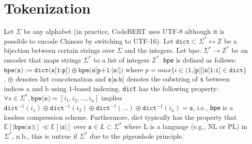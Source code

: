 \documentclass[usenames,dvipsnames]{article} %
\begin{document}
\section{Tokenization}

  Let $\Sigma$ be any alphabet (in practice, CodeBERT uses UTF-8 although it is possible to encode Chinese by switching to UTF-16).
  Let $\texttt{dict} \subset \Sigma^*\leftrightarrow\mathbb Z$ be a bijection between certain strings over $\Sigma$ and the integers.
  Let bpe: $\Sigma^*\rightarrow\mathbb{Z}^*$ be an encoder that maps strings $\Sigma^*$ to a list of integers $\mathbb{Z}^*$.
  \texttt{bpe} is defined as follows: $\texttt{bpe(s)} := \texttt{dict(s[1:p])} \oplus \texttt{bpe(s[p+1:|s|])}$ where $p = max \{ i \in \texttt{(1,|p|]} | \texttt{s[1:i]} \in \texttt{dict} \}$, $\oplus$ denotes list concatenation and $\texttt{s[a:b]}$ denotes the substring of \texttt{s} between indices a and b using 1-based indexing.
  \texttt{dict} has the following property: $\forall s \in \Sigma^*, \texttt{bpe(s)} = [i_1, i_2, \ldots, i_n]$ implies $\texttt{dict}^{-1}(i_1) \oplus \texttt{dict}^{-1}(i_2) \oplus \texttt{dict}^{-1}(\ldots) \oplus \texttt{dict}^{-1}(i_n) = \texttt{s}$, i.e., \texttt{bpe} is a lossless compression scheme.
  Furthermore, dict typically has the property that $\mathbb{E}[|\texttt{bpe(s)}|] \ll \mathbb{E}[|\texttt{s}|]$ over $\texttt{s} \in L \subset \Sigma^*$ where L is a language (e.g., NL or PL) in $\Sigma^*$, n.b., this is untrue if $\Sigma^*$ due to the pigeonhole principle.
\end{document}
